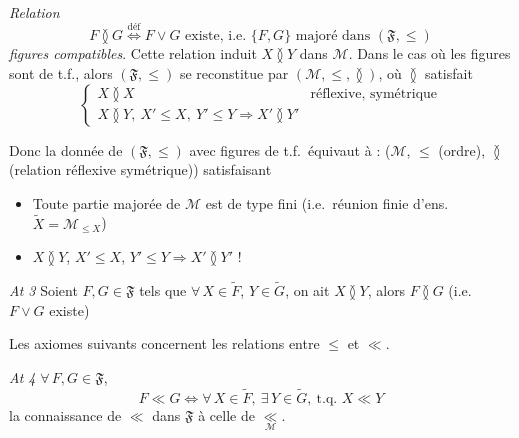\documentclass[11pt,a4paper]{article}
\begin{document}
\emph{Relation}
\[
  F \between G \overset{\mathrm{déf}}{\Longleftrightarrow} F \vee G \text{ existe, i.e.\ } \lbrace F, G \rbrace \text{ majoré dans } (\mathfrak{F}, \leq)
\]
\emph{figures compatibles}. Cette relation induit $X \between Y$ dans $\mathcal{M}$. Dans le cas où les figures sont de t.f., alors $(\mathfrak{F}, \leq)$  \struck{\ill{}} se reconstitue par $(\mathcal{M}, \leq, \between)$, où $\between$ satisfait
\[
  \begin{cases}
    X \between X & \text{réflexive, symétrique} \\
    X \between Y,\ X' \leq X,\ Y' \leq Y \Longrightarrow X' \between Y'
  \end{cases}
\]

Donc la donnée de $(\mathfrak{F}, \leq)$ avec figures de t.f.\ équivaut à : ($\mathcal{M}$, $\leq$ \struck{\ill{}} (ordre), $\between$ (relation réflexive symétrique)) satisfaisant
\begin{itemize}
  \item[a)] \struck{\ill{}}  Toute partie  majorée de $\mathcal{M}$ est de type fini (i.e.\ réunion finie d'ens.\ $\widetilde{X} = \mathcal{M}_{\leq X}$)
  \item[b)] $X \between Y$, $X' \leq X$, $Y' \leq Y \Longrightarrow X' \between Y'$ !
\end{itemize}


\emph{At 3} \quad Soient $F, G \in \mathfrak{F}$ tels que $\forall\, X \in \widetilde{F}$, $Y \in \widetilde{G}$, on ait $X \between Y$, alors $F \between G$ (i.e.\ $F \vee G$ existe)


 Les axiomes suivants concernent les relations entre $\leq$ et $\ll$.

\emph{At 4} \quad $\forall\, F, G \in \mathfrak{F}$,
\[
  F \ll G \Longleftrightarrow \forall\, X \in \widetilde{F},\ \exists\, Y \in \widetilde{G},\ \text{t.q.\ } X \ll Y
\]
 la connaissance de $\ll$ dans $\mathfrak{F}$ à celle de $\underset{\mathcal{M}}{\ll}$.

\end{document}
